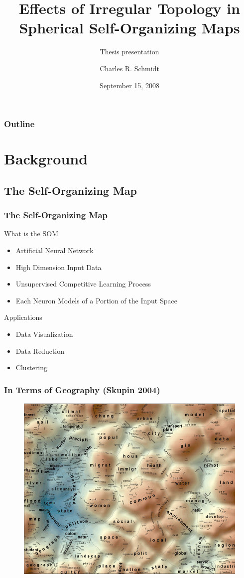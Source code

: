 \documentclass[nototal,handout]{beamer}
\author[Schmidt]{Charles R. Schmidt}
\institute[SDSU]{Department of Geography\\San Diego State University}
\title[Irregular Topology in Spherical-SOM]{Effects of Irregular Topology in Spherical Self-Organizing Maps}
\subtitle{Thesis presentation}
\date[Thesis]{September 15, 2008}
\begin{document}
\begin{frame}
  \titlepage
\end{frame}
\begin{frame}
  \frametitle{Outline}
  \tableofcontents[pausesections]
\end{frame}



\section{Background} 

\subsection{The Self-Organizing Map} 

\begin{frame}
	\frametitle{The Self-Organizing Map}
 
\begin{block}{What is the SOM}
 \begin{itemize}
 \item  Artificial Neural Network
 \item  High Dimension Input Data
 \item  Unsupervised Competitive Learning Process
 \item  Each Neuron Models of a Portion of the Input Space
 \end{itemize}
 \end{block} 
\begin{block}{Applications}
 \begin{itemize}
 \item  Data Visualization
 \item  Data Reduction
 \item  Clustering
 \end{itemize}
 \end{block} \end{frame} 

\begin{frame}
	\frametitle{In Terms of Geography (Skupin 2004)}
  \begin{center}
  \begin{figure}
  \includegraphics[width=.8\linewidth]{skupin.png}
  \end{figure}
  \end{center}
 \end{frame} 
\end{document}
